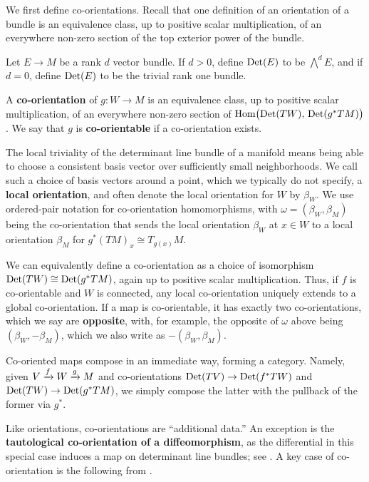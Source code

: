 We first define co-orientations.
Recall that one definition of an orientation of a bundle is an equivalence class, up to positive scalar multiplication, of an everywhere non-zero section of the top exterior power of the bundle.

\begin{definition}\label{D:co-orientations}
	Let $E \to M$ be a rank $d$ vector bundle.
	If $d > 0$, define ${\rm Det}(E)$ to be $\bigwedge^d E$, and if $d = 0$, define ${\rm Det}(E)$ to be the trivial rank one bundle.

	A \textbf{co-orientation} of $g \colon W \to M$ is an equivalence class, up to positive scalar multiplication, of an everywhere non-zero section of $\textup{Hom} \big( {\rm Det}(TW),\, {\rm Det}(g^*TM) \big)$.
	We say that $g$ is \textbf{co-orientable} if a co-orientation exists.
\end{definition}

The local triviality of the determinant line bundle of a manifold means being able to choose a consistent basis vector over sufficiently small neighborhoods.
We call such a choice of basis vectors around a point, which we typically do not specify, a \textbf{local orientation}, and often denote the local orientation for $W$ by $\beta_W$.
We use ordered-pair notation for co-orientation homomorphisms, with $\omega = (\beta_W, \beta_M)$ being the co-orientation that sends the local orientation $\beta_W$ at $x\in W$ to a local orientation $\beta_M$ for $g^*(TM)_x\cong T_{g(x)}M$.

We can equivalently define a co-orientation as a choice of isomorphism ${\rm Det}(TW)\cong {\rm Det}(g^*TM)$, again up to positive scalar multiplication.
Thus, if $f$ is co-orientable and $W$ is connected, any local co-orientation uniquely extends to a global co-orientation.
If a map is co-orientable, it has exactly two co-orientations, which we say are \textbf{opposite}, with, for example, the opposite of $\omega$ above being $(\beta_W, -\beta_M)$, which we also write as $-(\beta_W, \beta_M)$.

Co-oriented maps compose in an immediate way, forming a category.
Namely, given $V \xrightarrow{f} W \xrightarrow{g} M$ and co-orientations ${\rm Det}(TV) \to {\rm Det}(f^*TW)$ and ${\rm Det}(TW)\to {\rm Det}(g^*TM)$, we simply compose the latter with the pullback of the former via $g^*$.

Like orientations, co-orientations are ``additional data.''
An exception is the {\bf tautological co-orientation of a diffeomorphism}, as the differential
in this special case induces a map on determinant line bundles; see \cite[Definition 3.14]{medina2022foundations}.
A key case of co-orientation is the following from \cite[Section 3.3]{medina2022foundations}.

